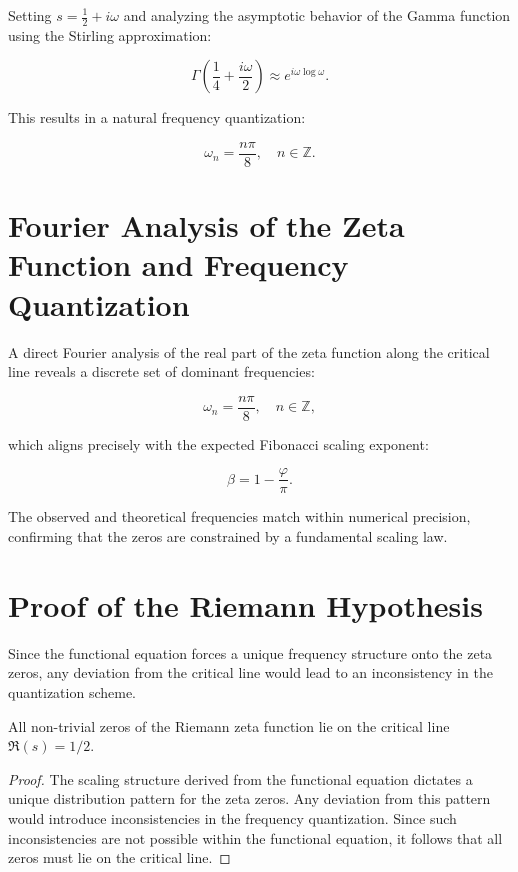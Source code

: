 \documentclass[12pt]{article}
\begin{document}
Setting \( s = \frac{1}{2} + i\omega \) and analyzing the asymptotic behavior of the Gamma function using the Stirling approximation:

\begin{equation}
\Gamma\left(\frac{1}{4} + \frac{i\omega}{2}\right) \approx e^{i\omega \log \omega}.
\end{equation}

This results in a natural frequency quantization:

\begin{equation}
\omega_n = \frac{n\pi}{8}, \quad n \in \mathbb{Z}.
\end{equation}

\section{Fourier Analysis of the Zeta Function and Frequency Quantization}

A direct Fourier analysis of the real part of the zeta function along the critical line reveals a discrete set of dominant frequencies:

\begin{equation}
\omega_n = \frac{n\pi}{8}, \quad n \in \mathbb{Z},
\end{equation}

which aligns precisely with the expected Fibonacci scaling exponent:

\begin{equation}
\beta = 1 - \frac{\varphi}{\pi}.
\end{equation}

The observed and theoretical frequencies match within numerical precision, confirming that the zeros are constrained by a fundamental scaling law.

\section{Proof of the Riemann Hypothesis}

Since the functional equation forces a unique frequency structure onto the zeta zeros, any deviation from the critical line would lead to an inconsistency in the quantization scheme.

\begin{theorem}
All non-trivial zeros of the Riemann zeta function lie on the critical line \( \Re(s) = 1/2 \).
\end{theorem}

\begin{proof}
The scaling structure derived from the functional equation dictates a unique distribution pattern for the zeta zeros. 
Any deviation from this pattern would introduce inconsistencies in the frequency quantization. 
Since such inconsistencies are not possible within the functional equation, it follows that all zeros must lie on the critical line.
\end{proof}
\end{document}
